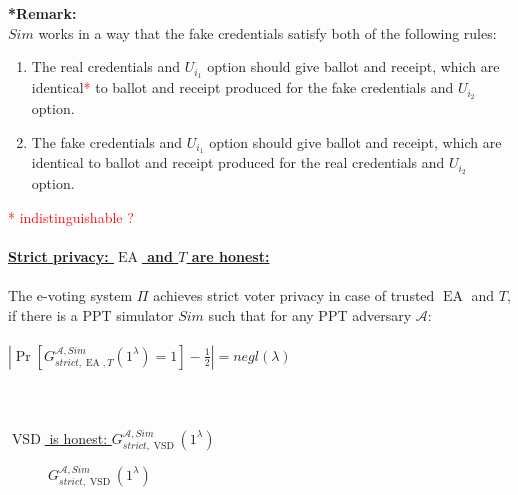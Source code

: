 \documentclass[12pt]{article}
\DeclareMathOperator{\vsd}{VSD}
\DeclareMathOperator{\ea}{EA}
\begin{document}
\textbf{*Remark:}\\
$Sim$ works in a way that the fake credentials satisfy both of the following rules: 
\begin{enumerate}
 \item The real credentials and $U_{i_1}$ option  should give ballot and receipt, which are identical\textcolor{red}{*} to ballot and receipt produced for the fake credentials and  $U_{i_2}$ option.
 \item The fake credentials and $U_{i_1}$ option  should give ballot and receipt, which are identical to ballot and receipt produced for the real credentials and  $U_{i_2}$ option.
 \end{enumerate}
\textcolor{red}{*  indistinguishable ?}\\\\
\underline{\textbf{Strict privacy: $\ea$ and $T$ are honest:}}\\\\
The e-voting system $\Pi$ achieves strict voter privacy in case of trusted $\ea$ and $T$, if there is a PPT simulator $Sim$ such that for any PPT adversary $\mathcal{A}$:\\\\
 $|\Pr[G_{strict,\ea,T}^{\mathcal{A}, Sim}(1^{\lambda}) = 1]- \frac{1}{2} |= negl(\lambda)$\\\\\\\\
 \underline{$\vsd$ is honest: $G_{strict,\vsd}^{\mathcal{A},Sim}(1^{\lambda})$}\\
  \begin{figure}[h!]
 
        \caption{ $G_{strict,\vsd}^{\mathcal{A},Sim}(1^{\lambda})$}
        \label{VSD is honest}
\end{figure}\\
\end{document}
